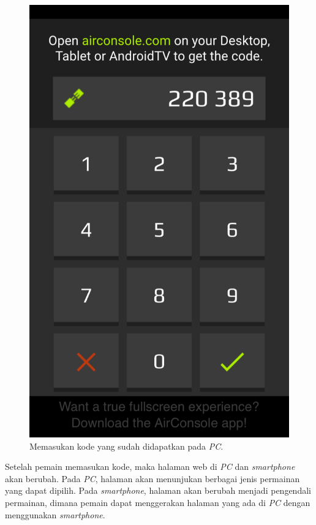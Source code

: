 \begin{figure}[H]
	
	\centering
	\includegraphics[scale=0.2]{Gambar/air3_code2}
	\caption{Memasukan kode yang sudah didapatkan pada \textit{PC}.}
	\label{fig:20_air3_code2}
	
	
\end{figure}


Setelah pemain memasukan kode, maka halaman web di \textit{PC} dan \textit{smartphone} akan berubah. Pada \textit{PC}, halaman akan menunjukan berbagai jenis permainan yang dapat dipilih. Pada \textit{smartphone}, halaman akan berubah menjadi pengendali permainan, dimana pemain dapat menggerakan halaman yang ada di \textit{PC} dengan menggunakan \textit{smartphone}.

